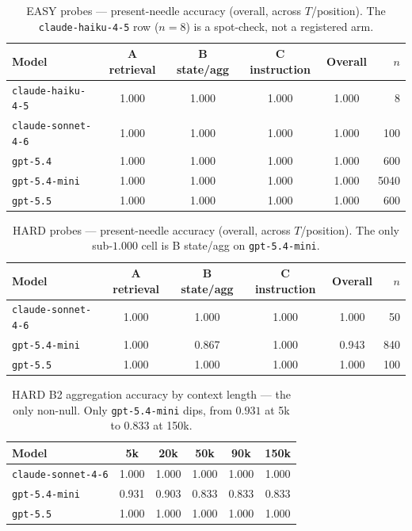 \documentclass[11pt]{article}
\begin{document}
\begin{table}
  \centering
  \caption{EASY probes --- present-needle accuracy (overall, across
  $T$/position). The \texttt{claude-haiku-4-5} row ($n=8$) is a spot-check,
  not a registered arm.}
  \label{tab:easy}
  \begin{tabular}{lccccr}
    \toprule
    Model & A retrieval & B state/agg & C instruction & Overall & $n$ \\
    \midrule
    \texttt{claude-haiku-4-5} & 1.000 & 1.000 & 1.000 & 1.000 & 8 \\
    \texttt{claude-sonnet-4-6} & 1.000 & 1.000 & 1.000 & 1.000 & 100 \\
    \texttt{gpt-5.4} & 1.000 & 1.000 & 1.000 & 1.000 & 600 \\
    \texttt{gpt-5.4-mini} & 1.000 & 1.000 & 1.000 & 1.000 & 5040 \\
    \texttt{gpt-5.5} & 1.000 & 1.000 & 1.000 & 1.000 & 600 \\
    \bottomrule
  \end{tabular}
\end{table}

\begin{table}
  \centering
  \caption{HARD probes --- present-needle accuracy (overall, across
  $T$/position). The only sub-$1.000$ cell is B state/agg on
  \texttt{gpt-5.4-mini}.}
  \label{tab:hard}
  \begin{tabular}{lccccr}
    \toprule
    Model & A retrieval & B state/agg & C instruction & Overall & $n$ \\
    \midrule
    \texttt{claude-sonnet-4-6} & 1.000 & 1.000 & 1.000 & 1.000 & 50 \\
    \texttt{gpt-5.4-mini} & 1.000 & 0.867 & 1.000 & 0.943 & 840 \\
    \texttt{gpt-5.5} & 1.000 & 1.000 & 1.000 & 1.000 & 100 \\
    \bottomrule
  \end{tabular}
\end{table}

\begin{table}
  \centering
  \caption{HARD B2 aggregation accuracy by context length --- the only
  non-null. Only \texttt{gpt-5.4-mini} dips, from $0.931$ at 5k to $0.833$
  at 150k.}
  \label{tab:b2}
  \begin{tabular}{lccccc}
    \toprule
    Model & 5k & 20k & 50k & 90k & 150k \\
    \midrule
    \texttt{claude-sonnet-4-6} & 1.000 & 1.000 & 1.000 & 1.000 & 1.000 \\
    \texttt{gpt-5.4-mini} & 0.931 & 0.903 & 0.833 & 0.833 & 0.833 \\
    \texttt{gpt-5.5} & 1.000 & 1.000 & 1.000 & 1.000 & 1.000 \\
    \bottomrule
  \end{tabular}
\end{table}
\end{document}
